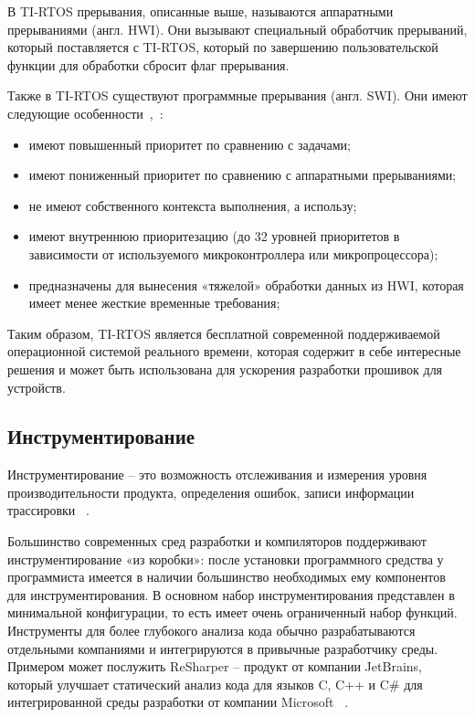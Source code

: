 
В TI-RTOS прерывания, описанные выше, называются аппаратными прерываниями (англ. HWI).
Они вызывают специальный обработчик прерываний, который поставляется с TI-RTOS,
который по завершению пользовательской функции для обработки сбросит флаг прерывания.

Также в TI-RTOS существуют программные прерывания (англ. SWI). Они имеют следующие
особенности~\cite{ma_tirtos_kernel},~\cite{tirtos_sysbios_user_guide}:
\begin{itemize}
    \item имеют повышенный приоритет по сравнению с задачами;
    \item имеют пониженный приоритет по сравнению с аппаратными прерываниями;
    \item не имеют собственного контекста выполнения, а использу;
    \item имеют внутреннюю приоритезацию (до 32 уровней приоритетов в зависимости
    от используемого микроконтроллера или микропроцессора);
    \item предназначены для вынесения «тяжелой» обработки данных из HWI,
        которая имеет менее жесткие временные требования;
\end{itemize}

Таким образом, TI-RTOS является бесплатной современной поддерживаемой
операционной системой реального времени, которая содержит в себе интересные решения
и может быть использована для ускорения разработки прошивок для устройств.


\subsection{Инструментирование}

Инструментирование -- это возможность отслеживания и измерения уровня
производительности продукта, определения ошибок, записи информации
трассировки ~\cite{instrumentation_site}.

Большинство современных сред разработки и компиляторов поддерживают
инструментирование «из коробки»: после установки программного средства
у программиста имеется в наличии большинство необходимых ему компонентов
для инструментирования. В основном набор инструментирования представлен в
минимальной конфигурации, то есть имеет очень ограниченный набор функций.
Инструменты для более глубокого анализа кода обычно разрабатываются отдельными
компаниями и интегрируются в привычные разработчику среды. Примером может
послужить ReSharper -- продукт от компании JetBrains, который улучшает
статический анализ кода для языков C, C++ и C\# для интегрированной среды
разработки от компании Microsoft ~\cite{resharper_site}.

